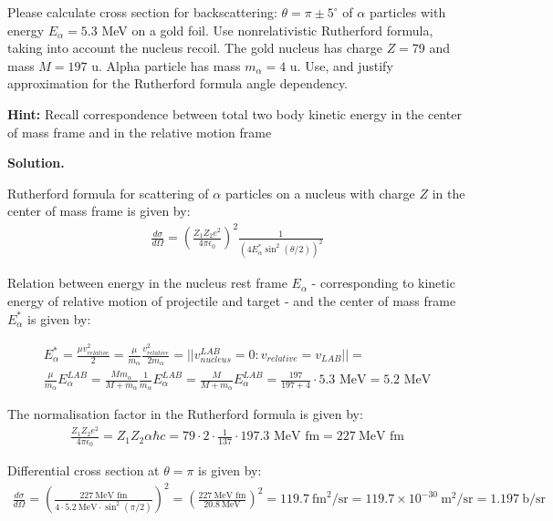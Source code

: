 \documentclass[11pt,a4paper]{article}
\newenvironment{solution}{\vspace{1cm} \par\textbf{Solution.} \vspace{1cm}}{\newpage}
\begin{document}
Please calculate cross section for backscattering: $\theta = \pi \pm 5^\circ$ of 
$\alpha$ particles with energy $E_\alpha = 5.3$ MeV
on a gold foil. Use nonrelativistic Rutherford formula, taking into account
the nucleus recoil. The gold nucleus has charge $Z=79$ and mass $M = 197$ u. 
Alpha particle has mass $m_\alpha = 4$ u. Use, and justify approximation for 
the Rutherford formula angle dependency.

\vspace{0.2cm}

{\bf Hint:} Recall correspondence between total two body kinetic energy 
in the center of mass frame and in the relative motion frame 

\begin{solution}

Rutherford formula for scattering of $\alpha$ particles on a nucleus with 
charge $Z$ in the center of mass frame is given by:
\begin{align*}
\frac{d\sigma}{d\Omega} = 
\left( \frac{Z_{1}Z_{2} e^2}{4\pi \epsilon_0} \right)^2 \frac{1}{(4 E^{*}_\alpha \sin^2(\theta/2))^2}
\end{align*}

Relation between energy in the nucleus rest frame $E_\alpha$ - 
corresponding to kinetic energy of relative motion of projectile and target -
and the center of mass frame $E_\alpha^{*}$ is given by:

\begin{align*}
E_\alpha^{*} = \frac{\mu v_{relative}^{2}}{2} = 
\frac{\mu}{m_\alpha} \frac{v_{relative}^{2}}{2 m_\alpha} =
|| v^{LAB}_{nucleus}=0: v_{relative} = v_{LAB} || = \\
\frac{\mu}{m_\alpha} E^{LAB}_\alpha = \frac{M m_\alpha}{M + m_\alpha} \frac{1}{m_\alpha} E^{LAB}_\alpha =
\frac{M}{M + m_\alpha} E^{LAB}_\alpha = \frac{197}{197 + 4} \cdot 5.3 \text{ MeV} = 5.2 \text{ MeV}
\end{align*}

The normalisation factor in the Rutherford formula is given by:
\begin{align*}
\frac{Z_{1}Z_{2} e^2}{4\pi \epsilon_0} = Z_{1}Z_{2} \alpha \hbar c = 79 \cdot  2 \cdot \frac{1}{137} \cdot 197.3 \text{ MeV fm} = 227~\text{MeV fm}
\end{align*}

Differential cross section at $\theta = \pi$ is given by:
\begin{align*}
\frac{d\sigma}{d\Omega} = 
\left( \frac{227~\text{MeV fm}}{4 \cdot 5.2~\text{MeV} \cdot \sin^2(\pi/2)} \right)^2 = 
\left( \frac{227~\text{MeV fm}}{20.8~\text{MeV}} \right)^2 = 
119.7~\text{fm}^2/\text{sr} = 
119.7 \times 10^{-30}~\text{m}^2/\text{sr} = 1.197~\text{b/sr}
\end{align*}


\end{solution}
\end{document}

